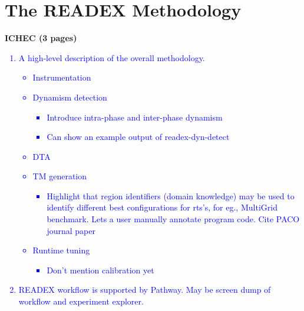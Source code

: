 \section{The READEX Methodology} \label{sec:methodology}
\textbf{ICHEC (3 pages)}
\textcolor{blue}{
\begin{enumerate}
	\item A high-level description of the overall methodology.
	\begin{itemize}
		\item Instrumentation
		\item Dynamism detection
		\begin{itemize}
			\item Introduce intra-phase and inter-phase dynamism
			\item Can show an example output of readex-dyn-detect
		\end{itemize}
		\item DTA
		\item TM generation
		\begin{itemize}
			\item Highlight that region identifiers (domain knowledge) may be used to identify different best configurations for rts's, for eg., MultiGrid benchmark. Lets a user manually annotate program code. Cite PACO journal paper
		\end{itemize}
		\item Runtime tuning
		\begin{itemize}
			\item Don't mention calibration yet
		\end{itemize}
	\end{itemize}
	\item READEX workflow is supported by Pathway. May be screen dump of workflow and experiment explorer.
\end{enumerate}}